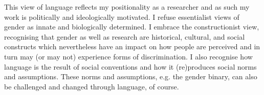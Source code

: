 This view of language reflects my positionality as a researcher and as such my work is politically and ideologically motivated. I refuse essentialist views of gender as innate and biologically determined. I embrace the constructionist view, recognising that gender as well as research are historical, cultural, and social constructs which nevertheless have an impact on how people are perceived and in turn may (or may not) experience forms of discrimination. I also recognise how language is the result of social conventions and how it (re)produces social norms and assumptions. These norms and assumptions, e.g. the gender binary, can also be challenged and changed through language, of course.


